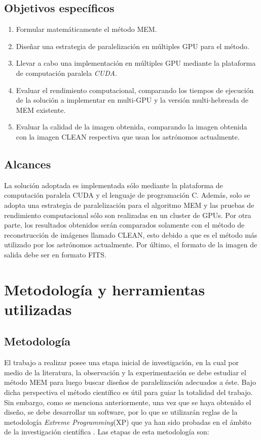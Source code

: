 \subsection{Objetivos espec\'ificos}

\begin{enumerate}
\item Formular matemáticamente el método MEM.
\item Diseñar una estrategia de paralelización en múltiples GPU para el método.
\item Llevar a cabo una implementación en múltiples GPU mediante la plataforma de computación paralela \textit{CUDA}.
\item Evaluar el rendimiento computacional, comparando los tiempos de ejecución de la solución a implementar en multi-GPU y la versión multi-hebreada de MEM existente.
\item Evaluar la calidad de la imagen obtenida, comparando la imagen obtenida con la imagen CLEAN respectiva que usan los astrónomos actualmente.
\end{enumerate}

\subsection{Alcances}
La solución adoptada es implementada sólo mediante la plataforma de computación paralela CUDA y el lenguaje de programación C. Además, solo se adopta una estrategia de paralelización  para el algoritmo MEM y las pruebas de rendimiento computacional sólo son realizadas en un cluster de GPUs. Por otra parte, los resultados obtenidos serán comparados solamente con el método de reconstrucción de imágenes llamado CLEAN, esto debido a que es el método más utilizado por los astrónomos actualmente. Por último, el formato de la imagen de salida debe ser en formato FITS.


\section{Metodolog\'ia y herramientas utilizadas}
\label{intro:metodologia}

\subsection{Metodolog\'ia}
El trabajo a realizar posee una etapa inicial de investigación, en la cual por medio de la literatura, la observación y la experimentación se debe estudiar el método MEM  para luego buscar diseños de paralelización adecuados a éste. Bajo dicha perspectiva el método científico es útil para guiar la totalidad del trabajo. Sin embargo, como se menciona anteriormente, una vez que se haya obtenido el diseño, se debe desarrollar un software, por lo que se utilizarán reglas de la metodología \textit{Extreme Programming}(XP) que ya han sido probadas en el ámbito de la investigación científica \citep{xp}. Las etapas de esta metodología son:

